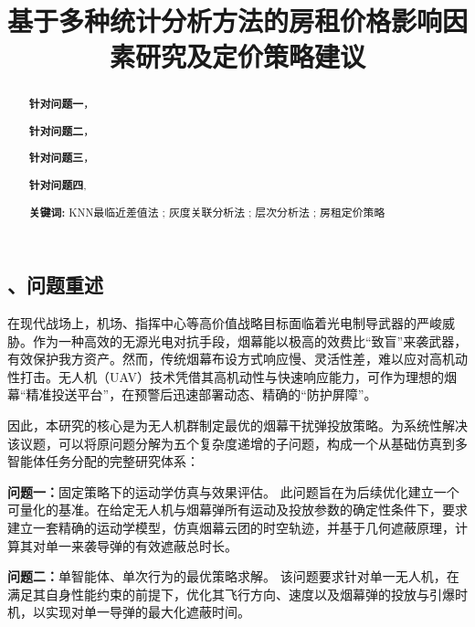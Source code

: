 \documentclass[12pt]{article}
\title{ \textbf{基于多种统计分析方法的房租价格影响因素研究及定价策略建议}}
\date{}
\begin{document}
	\begin{CJK}{UTF8}{gbsn}
		
		\maketitle  %
		
		\setcounter{page}{1}
		
		\vspace{-7em}
		\begin{abstract}  %
			\vspace{1em}
			
			
			\textbf{针对问题一}，
			
			\textbf{针对问题二}，
			
			\textbf{针对问题三}，
			
			\textbf{针对问题四},
			
			\noindent\textbf{关键词:} KNN最临近差值法 ; 灰度关联分析法 ; 层次分析法 ; 房租定价策略
			
			
		\end{abstract}
		
		\newpage
		
		\section{、问题重述}
		
		
		在现代战场上，机场、指挥中心等高价值战略目标面临着光电制导武器的严峻威胁。作为一种高效的无源光电对抗手段，烟幕能以极高的效费比“致盲”来袭武器，有效保护我方资产。然而，传统烟幕布设方式响应慢、灵活性差，难以应对高机动性打击。无人机（UAV）技术凭借其高机动性与快速响应能力，可作为理想的烟幕“精准投送平台”，在预警后迅速部署动态、精确的“防护屏障”。
		
		因此，本研究的核心是为无人机群制定最优的烟幕干扰弹投放策略。为系统性解决该议题，可以将原问题分解为五个复杂度递增的子问题，构成一个从基础仿真到多智能体任务分配的完整研究体系：
		
		\textbf{问题一：}固定策略下的运动学仿真与效果评估。
		此问题旨在为后续优化建立一个可量化的基准。在给定无人机与烟幕弹所有运动及投放参数的确定性条件下，要求建立一套精确的运动学模型，仿真烟幕云团的时空轨迹，并基于几何遮蔽原理，计算其对单一来袭导弹的有效遮蔽总时长。
		
		\textbf{问题二：}单智能体、单次行为的最优策略求解。
		该问题要求针对单一无人机，在满足其自身性能约束的前提下，优化其飞行方向、速度以及烟幕弹的投放与引爆时机，以实现对单一导弹的最大化遮蔽时间。
		

\end{CJK}
\end{document}
